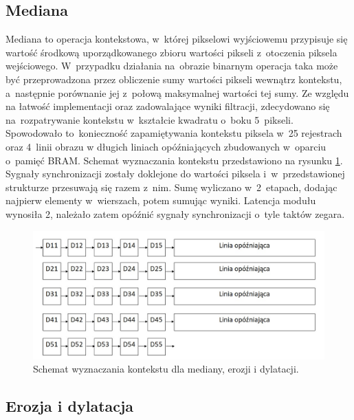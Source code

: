 

\subsection{Mediana}
\label{subsec:Mediana}

Mediana to operacja kontekstowa, w~której pikselowi wyjściowemu przypisuje się wartość środkową uporządkowanego zbioru wartości pikseli z~otoczenia piksela wejściowego. 
W~przypadku działania na~obrazie binarnym operacja taka może być przeprowadzona przez obliczenie sumy wartości pikseli wewnątrz kontekstu, a~następnie porównanie jej z~połową maksymalnej wartości tej sumy. 
Ze względu na łatwość implementacji oraz zadowalające wyniki filtracji, zdecydowano się na~rozpatrywanie kontekstu w~kształcie kwadratu o~boku 5~pikseli. 
Spowodowało to~konieczność zapamiętywania kontekstu piksela w~25 rejestrach oraz 4~linii obrazu w długich liniach opóźniających zbudowanych w~oparciu o~pamięć BRAM.
Schemat wyznaczania kontekstu przedstawiono na rysunku \ref{fig:kontekst}. 
Sygnały synchronizacji zostały doklejone do wartości piksela i~w~przedstawionej strukturze przesuwają się razem z~nim. 
Sumę wyliczano w~2~etapach, dodając najpierw elementy w~wierszach, potem sumując wyniki. 
Latencja modułu wynosiła 2, należało zatem opóźnić sygnały synchronizacji o~tyle taktów zegara. %
\begin{figure}[h]
	\centering
	\includegraphics[width=\textwidth]{kontekst.jpg}
	\caption{Schemat wyznaczania kontekstu dla mediany, erozji i dylatacji.}
	\label{fig:kontekst}
\end{figure}  


\subsection{Erozja i dylatacja}
\label{subsec:erozja}

